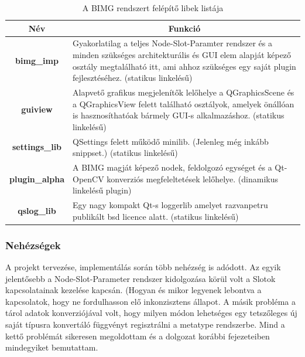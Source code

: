 \documentclass[a4paper,12pt,oneside]{report}
\begin{document}
\begin{table}[h]
\begin{tabular}{p{1cm}|p{12cm}}

\toprule
\multicolumn{1}{c|}{\textbf{Név}} & \multicolumn{1}{|c}{\textbf{Funkció}} \\ \midrule
\multicolumn{1}{c|}{\textbf{bimg\_imp}}  & Gyakorlatilag a teljes Node-Slot-Paramter rendszer és a minden szükséges architekturális és GUI elem alapját képező osztály megtalálható itt, ami ahhoz szükséges egy saját plugin fejlesztéséhez. (statikus linkelésű)\\
\hline
\multicolumn{1}{c|}{\textbf{guiview}}  &  Alapvető grafikus megjelenítők lelőhelye a QGraphicsScene és a QGraphicsView felett található osztályok, amelyek önállóan is hasznosíthatóak bármely GUI-s alkalmazáshoz. (statikus linkelésű)\\
\hline
\multicolumn{1}{c|}{\textbf{settings\_lib}}  & QSettings felett működő minilib. (Jelenleg még inkább snippset.) (statikus linkelésű)\\
\hline
\multicolumn{1}{c|}{\textbf{plugin\_alpha}}  & A BIMG magját képező nodek, feldolgozó egységet és a Qt-OpenCV konverziós megfeleltetések lelőhelye. (dinamikus linkelésű plugin)\\
\hline
\multicolumn{1}{c|}{\textbf{qslog\_lib}}  & Egy nagy kompakt Qt-s loggerlib\cite{website:qslog_site} amelyet razvanpetru publikált bsd licence alatt. (statikus linkelésű)\\
\hline

\end{tabular}
\caption{A BIMG rendszert felépítő libek listája }
\label{table:bimg_namespace}
\end{table}
\subsubsection{Nehézségek}
A projekt tervezése, implementálás során több nehézség is adódott. Az egyik jelentősebb a Node-Slot-Parameter rendszer kidolgozása körül volt a Slotok kapcsolatainak kezelése kapcsán. (Hogyan és mikor legyenek lebontva a kapcsolatok, hogy ne fordulhasson elő inkonzisztens állapot. A másik probléma a tárol adatok konverziójával volt, hogy milyen módon lehetséges egy tetszőleges új saját típusra konvertáló függvényt regisztrálni a metatype rendszerbe. Mind a kettő problémát sikeresen megoldottam és a dolgozat korábbi fejezeteiben mindegyiket bemutattam.
\end{document}
